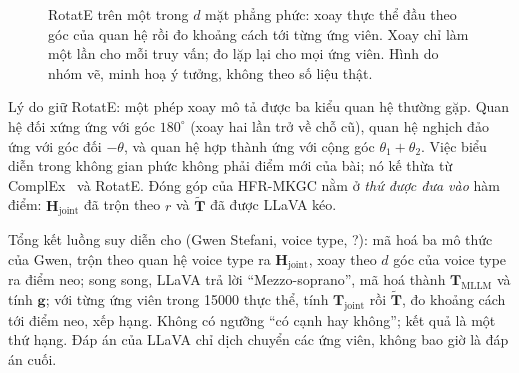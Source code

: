 \documentclass[conference,a4paper]{IEEEtran}
\newcommand{\Hj}{\mathbf{H}_{\mathrm{joint}}}
\newcommand{\Tj}{\mathbf{T}_{\mathrm{joint}}}
\newcommand{\Tm}{\mathbf{T}_{\mathrm{MLLM}}}
\newcommand{\Tt}{\tilde{\mathbf{T}}}
\begin{document}
\begin{figure}[t]
\centering
{}
\caption{RotatE trên một trong $d$ mặt phẳng phức: xoay thực thể đầu theo góc của quan hệ rồi đo khoảng cách tới từng ứng viên. Xoay chỉ làm một lần cho mỗi truy vấn; đo lặp lại cho mọi ứng viên. Hình do nhóm vẽ, minh hoạ ý tưởng, không theo số liệu thật.}
\label{fig:rotate}
\end{figure}

Lý do giữ RotatE: một phép xoay mô tả được ba kiểu quan hệ thường gặp. Quan hệ đối xứng ứng với góc $180^\circ$ (xoay hai lần trở về chỗ cũ), quan hệ nghịch đảo ứng với góc đối $-\theta$, và quan hệ hợp thành ứng với cộng góc $\theta_1 + \theta_2$. Việc biểu diễn trong không gian phức không phải điểm mới của bài; nó kế thừa từ ComplEx~\cite{complex} và RotatE. Đóng góp của HFR-MKGC nằm ở \emph{thứ được đưa vào} hàm điểm: $\Hj$ đã trộn theo $r$ và $\Tt$ đã được LLaVA kéo.

Tổng kết luồng suy diễn cho (Gwen Stefani, voice type, ?): mã hoá ba mô thức của Gwen, trộn theo quan hệ voice type ra $\Hj$, xoay theo $d$ góc của voice type ra điểm neo; song song, LLaVA trả lời ``Mezzo-soprano'', mã hoá thành $\Tm$ và tính $\mathbf{g}$; với từng ứng viên trong 15000 thực thể, tính $\Tj$ rồi $\Tt$, đo khoảng cách tới điểm neo, xếp hạng. Không có ngưỡng ``có cạnh hay không''; kết quả là một thứ hạng. Đáp án của LLaVA chỉ dịch chuyển các ứng viên, không bao giờ là đáp án cuối.
\end{document}
